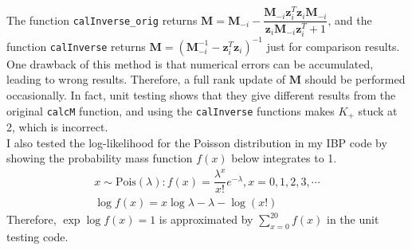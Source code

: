 The function \texttt{calInverse\_orig} returns $\mathbf{M} = \mathbf{M}_{-i} - \dfrac{\mathbf{M}_{-i}\mathbf{z}^T_i \mathbf{z}_i\mathbf{M}_{-i}}{\mathbf{z}_i\mathbf{M}_{-i}\mathbf{z}^T_i + 1}$, and the function \texttt{calInverse} returns $\mathbf{M} = (\mathbf{M}_{-i}^{-1} - \mathbf{z}^T_i \mathbf{z}_i)^{-1} $ just for comparison results. One drawback of this method is that numerical errors can be accumulated, leading to wrong results. Therefore, a full rank update of $\mathbf{M}$ should be performed occasionally. In fact, unit testing shows that they give different results from the original \texttt{calcM} function, and using the \texttt{calInverse} functions makes $K_+$ stuck at 2, which is incorrect.\\

I also tested the log-likelihood for the Poisson distribution in my IBP code by showing the probability mass function $f(x)$ below integrates to 1.
\begin{gather}
x \sim \text{Pois}(\lambda): f(x) = \dfrac{\lambda^x}{x!} e^{-\lambda}, x = 0,1,2,3,\cdots \\
\log f(x) = x \log \lambda - \lambda - \log(x!)
\end{gather}
Therefore, $\exp \log f(x) = 1$ is approximated by $\sum^{20}_{x=0}f(x)$ in the unit testing code.\\